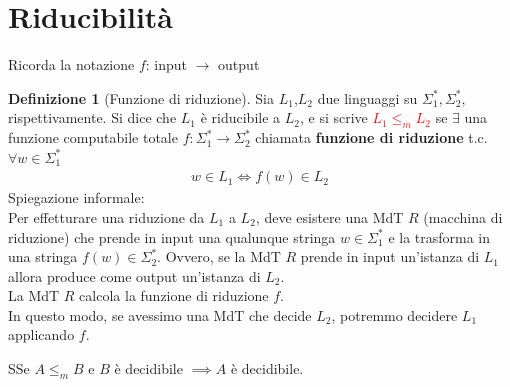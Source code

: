 \documentclass{article}  %
\theoremstyle{definition}
\newtheorem{definition}{Definizione}[section]
\begin{document}
\section{Riducibilità}
Ricorda la notazione $f$: input $\rightarrow$ output
\begin{definition}[Funzione di riduzione]
	Sia $L_1$,$L_2$ due linguaggi su $\Sigma_{1}^*,\Sigma_{2}^*,$ rispettivamente.
	Si dice che $L_1$ è riducibile a $L_2$, e si scrive \textcolor{red}{$L_1 \leq_{m} L_2$} se $\exists$ una funzione computabile totale
	$f:\Sigma^*_1 \rightarrow \Sigma^*_2$ chiamata \textbf{funzione di riduzione} t.c. $\forall{w}\in \Sigma^*_1$
	\begin{align*}
		w \in L_1 \iff f(w) \in L_2
	\end{align*}
	Spiegazione informale:\\
	Per effetturare una riduzione da $L_1$ a $L_2$, deve esistere una MdT $R$ (macchina di riduzione) che prende in input
	una qualunque stringa $w \in \Sigma^*_1$ e la trasforma in una stringa $f(w) \in \Sigma^*_2$.
	Ovvero, se la MdT $R$ prende in input un'istanza di $L_1$ allora produce come output un'istanza di $L_2$. \\
	La MdT $R$ calcola la funzione di riduzione $f$. \\
	In questo modo, se avessimo una MdT che decide $L_2$, potremmo decidere $L_1$ applicando $f$.
\end{definition}
\begin{theorem}{3.1}
	SSe $A \leq_m B$ e $B$ è decidibile $\implies A$ è decidibile.
\end{theorem}
\end{document}
